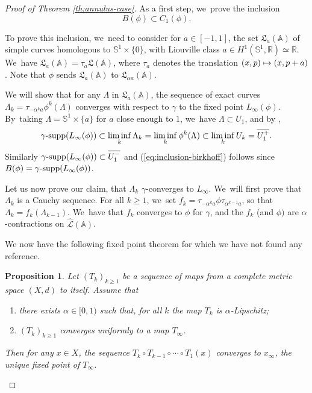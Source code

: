 \documentclass[JEP,XML,SOM,Unicode,NoFloatCountersInSection,published]{cedram}
\newcommand\mto{\mathchoice{\longmapsto}{\mapsto}{\mapsto}{\mapsto}}
\newtheorem{prop}[thm]{Proposition}
\theoremstyle{definition}
\DeclareMathOperator{\gammasupp}{\gamma\textup{-supp}}
\begin{document}
\begin{proof}[Proof of Theorem \ref{th:annulus-case}] As a first step, we~prove the inclusion
\begin{equation}
B(\phi) \subset C_{1}(\phi).\label{eq:inclusion-birkhoff}
\end{equation}

To prove this inclusion, we~need to consider for $a\in[-1,1]$, the set $\mathfrak{L}_a(\mathbb A)$ of simple curves homologous to $\mathbb S^1 \times \{0\}$, with Liouville class $a \in H^{1}(\mathbb S^{1}, {\mathbb R}) \simeq {\mathbb R} $. We~have $\mathfrak L_{a}(\mathbb A) =\tau_a\mathfrak L(\mathbb A)$, where $\tau_a$ denotes the translation $(x,p)\mto (x,p+a)$. Note that $\phi$ sends $\mathfrak L_{a}(\mathbb A)$ to $\mathfrak L_{\alpha a}(\mathbb A)$.

We will show that for any $\Lambda$ in $\mathfrak L_{a}(\mathbb A)$, the sequence of exact curves $\Lambda_k=\tau_{-\alpha^ka}\phi^k(\Lambda)$ converges with respect to $\gamma$ to the fixed point $L_\infty(\phi)$. By~taking $\Lambda=\mathbb S^1\times \{a\}$ for $a$ close enough to $1$, we~have $\Lambda\subset U_1$, and by \cite[Prop.\,6.17]{Viterbo-gammas},
\[
\gammasupp (L_{\infty}(\phi)) \subset \liminf_k\Lambda_k= \liminf_k\phi^k(\Lambda)\subset \liminf_k{U_k}=\overline{U_1^+}.
\]
Similarly $\gammasupp (L_{\infty}(\phi))\subset\overline{U_1^-}$ and (\ref{eq:inclusion-birkhoff}) follows since $B(\phi)=\gammasupp (L_{\infty}(\phi))$.

Let us now prove our claim, \ie that $\Lambda_k$ $\gamma$\nobreakdash-converges to $L_\infty$. We~will first prove that $\Lambda_k$ is a Cauchy sequence. For all $k\geq 1$, we~set $f_k=\tau_{-\alpha^ka} \phi \tau_{\alpha^{k-1}a}$, so that $\Lambda_{k}=f_k(\Lambda_{k-1})$. We~have that $f_{k}$ converges to $\phi$ for $\gamma$, and the $f_{k}$ (and $\phi)$ are $\alpha$\nobreakdash-contractions on $\widehat{\mathcal L} (\mathbb A)$.

We now have the following fixed point theorem for which we have not found any reference.

\begin{prop}
Let $(T_{k})_{k\geq 1}$ be a sequence of maps from a complete metric space $(X,d)$ to itself. Assume that
\begin{enumerate}
\item there exists $\alpha\in[0,1)$ such that, for all $k$ the map $T_{k}$ is $\alpha$-Lipschitz;
\item $(T_{k})_{k\geq 1}$ converges uniformly to a map $T_{\infty}$.
\end{enumerate}
Then for any $x\in X$, the sequence $T_{k}\circ T_{k-1}\circ \cdots \circ T_{1}(x)$ converges to $x_{\infty}$, the unique fixed point of $T_{\infty}$.
\end{prop}


\end{proof}
\end{document}
